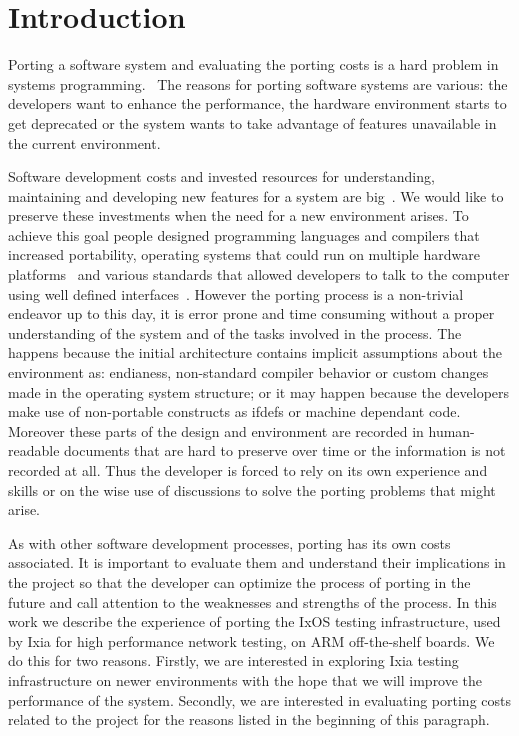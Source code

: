 \section{Introduction}

Porting a software system and evaluating the porting costs is a hard problem in
systems programming.~\cite{b1,b2,b4,b5,b9,b10,b11,b12,b13,b14,b15,b16} The
reasons for porting software systems are various: the developers want to enhance
the performance, the hardware environment starts to get deprecated or the system
wants to take advantage of features unavailable in the current environment.

Software development costs and invested resources for understanding, maintaining
and developing new features for a system are big~\cite{b17,b18,b19}. We would
like to preserve these investments when the need for a new environment arises.
To achieve this goal people designed programming languages and compilers that
increased portability, operating systems that could run on multiple hardware
platforms~\cite{b16} and various standards that allowed developers to talk to
the computer using well defined interfaces~\cite{b20}.  However the porting
process is a non-trivial endeavor up to this day, it is error prone and time
consuming without a proper understanding of the system and of the tasks involved
in the process. The happens because the initial architecture contains implicit
assumptions about the environment as: endianess, non-standard compiler behavior
or custom changes made in the operating system structure; or it may happen
because the developers make use of non-portable constructs as ifdefs \cite{b21}
or machine dependant code. Moreover these parts of the design and environment
are recorded in human-readable documents that are hard to preserve over time or
the information is not recorded at all. Thus the developer is forced to rely on
its own experience and skills or on the wise use of discussions to solve the
porting problems that might arise.

As with other software development processes, porting has its own costs
associated. It is important to evaluate them and understand their implications
in the project so that the developer can optimize the process of porting in the
future and call attention to the weaknesses and strengths of the process. In
this work we describe the experience of porting the IxOS testing infrastructure,
used by Ixia for high performance network testing, on ARM off-the-shelf boards.
We do this for two reasons. Firstly, we are interested in exploring Ixia testing
infrastructure on newer environments with the hope that we will improve the
performance of the system. Secondly, we are interested in evaluating porting
costs related to the project for the reasons listed in the beginning of this
paragraph. 

